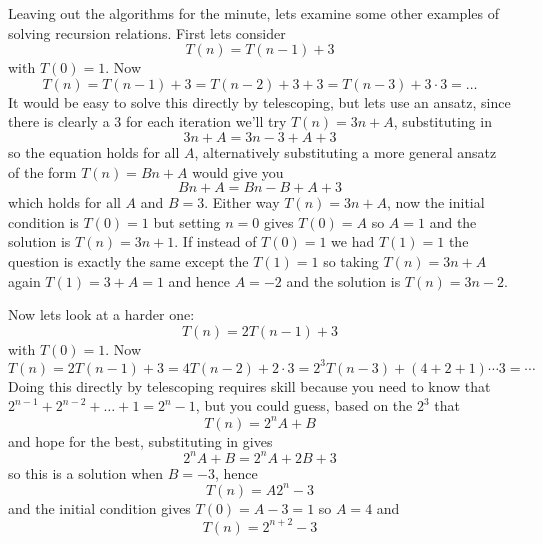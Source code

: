 \documentclass[11pt,a4paper]{scrartcl}
\begin{document}
Leaving out the algorithms for the minute, lets examine some other
examples of solving recursion relations. First lets consider
\begin{equation}
T(n)=T(n-1)+3
\end{equation}
with $T(0)=1$. Now 
\begin{equation}
T(n)=T(n-1)+3=T(n-2)+3+3=T(n-3)+3\cdot 3=\ldots
\end{equation}
It would be easy to solve this directly by telescoping, but lets use
an ansatz, since there is clearly a $3$ for each iteration we'll try
$T(n)=3n+A$, substituting in
$$3n+A=3n-3+A+3$$ so the equation holds for all $A$, alternatively substituting a more general
ansatz of the form $T(n)=Bn+A$ would give you
$$Bn+A=Bn-B+A+3$$ which holds for all $A$ and $B=3$. Either way
$T(n)=3n+A$, now the initial condition is $T(0)=1$ but setting $n=0$
gives $T(0)=A$ so $A=1$ and the solution is $T(n)=3n+1$. If instead of
$T(0)=1$ we had $T(1)=1$ the question is exactly the same except the
$T(1)=1$ so taking $T(n)=3n+A$ again $T(1)=3+A=1$ and hence $A=-2$ and
the solution is $T(n)=3n-2$.

Now lets look at a harder one:
\begin{equation}
T(n)=2T(n-1)+3
\end{equation}
with $T(0)=1$. Now 
\begin{equation}
T(n)=2T(n-1)+3=4T(n-2)+2\cdot 3=2^3T(n-3)+(4+2+1)\cdots 3 =\cdots
\end{equation}
Doing this directly by telescoping requires skill because you need to
know that $2^{n-1}+2^{n-2}+\ldots +1=2^n-1$, but you could guess,
based on the $2^3$ that
\begin{equation}
T(n)=2^nA+B
\end{equation}
and hope for the best, substituting in gives
$$2^nA+B=2^nA+2B+3$$
so this is a solution when $B=-3$, hence
$$T(n)=A2^n-3$$
and the initial condition gives $T(0)=A-3=1$ so $A=4$ and
$$T(n)=2^{n+2}-3$$
\end{document}
